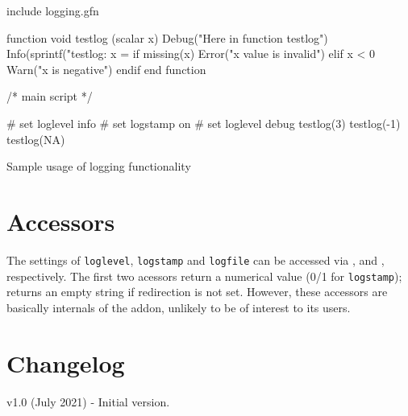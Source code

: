 \documentclass{article}
\begin{document}
\begin{script}[htbp]
\begin{scode}
include logging.gfn

function void testlog (scalar x)
   Debug("Here in function testlog")
   Info(sprintf("testlog: x = %
   if missing(x)
       Error("x value is invalid")
   elif x < 0
       Warn("x is negative")
   endif
end function

/* main script */

# set loglevel info
# set logstamp on
# set loglevel debug
testlog(3)
testlog(-1)
testlog(NA)
\end{scode}
\caption{Sample usage of logging functionality}
\label{listing:simple-ex}  
\end{script}

\section{Accessors}

The settings of \texttt{loglevel}, \texttt{logstamp} and
\texttt{logfile} can be accessed via ,
 and , respectively. The first two
acessors return a numerical value (0/1 for \texttt{logstamp});
 returns an empty string if redirection is not
set. However, these accessors are basically internals of the addon,
unlikely to be of interest to its users.

\section{Changelog}

v1.0 (July 2021)
- Initial version.
\end{document}
